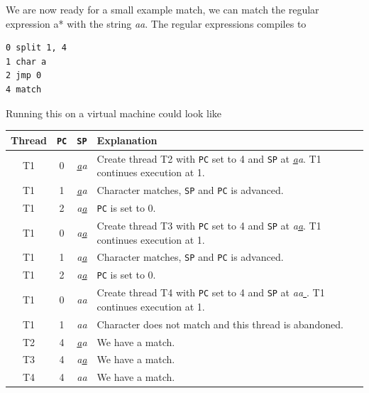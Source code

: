 \begin{example}
We are now ready for a small example match, we can match the regular
expression \textsf{a*} with the string \textsl{aa}. The regular
expressions compiles to
\begin{verbatim}
0 split 1, 4
1 char a
2 jmp 0
4 match
\end{verbatim}
Running this on a virtual machine could look like
\begin{center}
\begin{tabular}{cccp{7.5cm}}
Thread & \texttt{PC} & \texttt{SP} & Explanation \\
\hline
T1 & 0 & \textsl{\underline{a}a} & Create thread T2 with \texttt{PC}
set to 4 and \texttt{SP} at \textsl{\underline{a}a}. T1 continues
execution at 1. \\

T1 & 1 & \textsl{\underline{a}a} & Character matches, \texttt{SP} and
\texttt{PC} is advanced. \\

T1 & 2 & \textsl{a\underline{a}} & \texttt{PC} is set to 0.\\ 

T1 & 0 & \textsl{a\underline{a}} & Create thread T3 with \texttt{PC}
set to 4 and \texttt{SP} at \textsl{a\underline{a}}. T1 continues
execution at 1. \\

T1 & 1 & \textsl{a\underline{a}} & Character matches, \texttt{SP} and
\texttt{PC} is advanced. \\

T1 & 2 & \textsl{a\underline{a}} & \texttt{PC} is set to 0.\\

T1 & 0 & \textsl{aa\underline{ }} & Create thread T4 with \texttt{PC}
set to 4 and \texttt{SP} at \textsl{aa\underline{ }}. T1 continues
execution at 1. \\

T1 & 1 & \textsl{aa\underline{ }} & Character does not match and this
thread is abandoned.\\

T2 & 4 & \textsl{\underline{a}a} & We have a match. \\

T3 & 4 & \textsl{a\underline{a}} & We have a match. \\

T4 & 4 & \textsl{aa\underline{ }} & We have a match. \\
\end{tabular}
\end{center}
\end{example}

